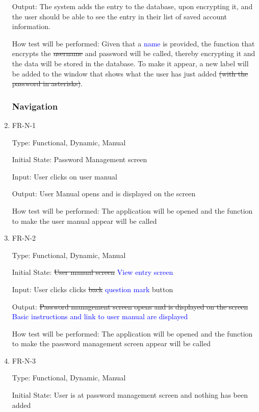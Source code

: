 \documentclass[12pt, titlepage]{article}
\begin{document}
\begin{enumerate}
Output: The system adds the entry to the database, upon encrypting it, and the user should be able to see the entry in their list of saved account information.

How test will be performed: Given that a \textcolor{blue}{name} is provided, the function that encrypts the \sout{username} and password will be called, thereby encrypting it and the data will be stored in the database. To make it appear, a new label will be added to the window that shows what the user has just added \sout{(with the password in asterisks)}.

\subsubsection{Navigation}

\item{FR-N-1\\}

Type: Functional, Dynamic, Manual

Initial State: Password Management screen

Input: User clicks on user manual

Output: User Manual opens and is displayed on the screen

How test will be performed: The application will be opened and the function to make the user manual appear will be called

\item{FR-N-2\\}

Type: Functional, Dynamic, Manual

Initial State: \sout{User manual screen} \textcolor{blue}{View entry screen}

Input: User clicks clicks \sout{back} \textcolor{blue}{question mark} button

Output: \sout{Password management screen opens and is displayed on the screen} \textcolor{blue}{Basic instructions and link to user manual are displayed}

How test will be performed: The application will be opened and the function to make the password management screen appear will be called

\item{FR-N-3\\}

Type: Functional, Dynamic, Manual

Initial State: User is at password management screen and nothing has been added


\end{enumerate}
\end{document}

